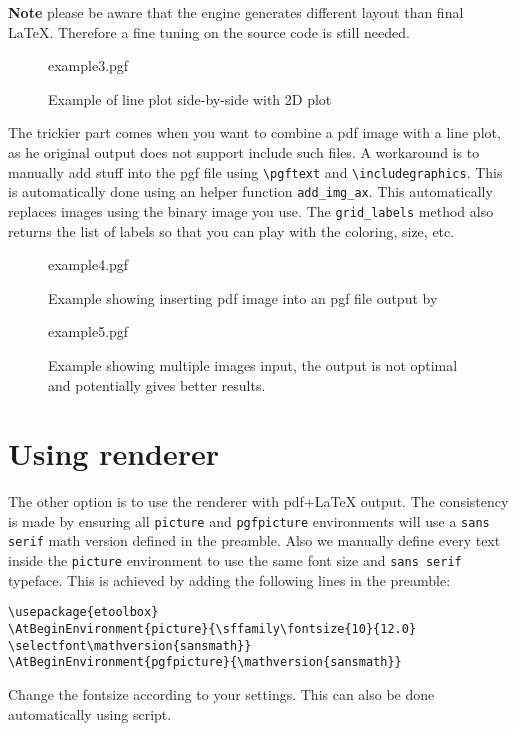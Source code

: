 \textbf{Note} please be aware that the \mpl{} engine generates
different layout than final \LaTeX{}. Therefore a fine tuning on the
\py{} source code is still needed.

\begin{figure}[htbp]
  \centering
  {example3.pgf}
  \caption{Example of line plot side-by-side with 2D plot}
  \label{fig:fig3}
\end{figure}

The trickier part comes when you want to combine a pdf image with a
line plot, as he original \mpl{} output does not support include such
files. A workaround is to manually add stuff into the pgf file using
\verb|\pgftext| and \verb|\includegraphics|. This is automatically
done using an helper function \verb|add_img_ax|. This automatically
replaces images using the binary image you use. The \verb|grid_labels|
method also returns the list of labels so that you can play with the
coloring, size, etc. 

\begin{figure}[htbp]
  \centering
  {example4.pgf}
  \caption{Example showing inserting pdf image into an pgf file output by \mpl{}}
  \label{fig:fig4}
\end{figure}

\begin{figure}[htbp]
  \centering
  {example5.pgf}
  \caption{Example showing multiple images input, the output
    is not optimal and potentially \ink{} gives better results.}
  \label{fig:fig5}
\end{figure}

\section{Using \ink{} renderer}
\label{sec:using-ink-render}

The other option is to use the \ink{} renderer with pdf+\LaTeX{}
output. The consistency is made by ensuring all \texttt{picture} and
\texttt{pgfpicture} environments will use a \texttt{sans serif} math
version defined in the preamble. Also we manually define every text
inside the \texttt{picture} environment to use the same font size and
\texttt{sans serif} typeface. This is achieved by adding the following
lines in the preamble:

\begin{verbatim}
\usepackage{etoolbox}
\AtBeginEnvironment{picture}{\sffamily\fontsize{10}{12.0}
\selectfont\mathversion{sansmath}}
\AtBeginEnvironment{pgfpicture}{\mathversion{sansmath}}
\end{verbatim}
Change the fontsize according to your settings. This can also be done
automatically using \py{} script.


